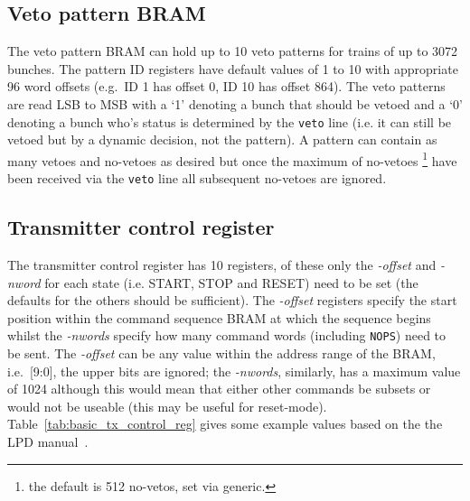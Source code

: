 \documentclass[]{article}
\begin{document}
    \subsection{Veto pattern BRAM} %
    \label{sub:basic_veto_pattern_bram}
    The veto pattern BRAM can hold up to 10 veto patterns for trains of up to 3072 bunches. The pattern ID registers have default values of 1 to 10 with appropriate 96 word offsets (e.g.\ ID 1 has offset 0, ID 10 has offset 864). The veto patterns are read LSB to MSB with a `1' denoting a bunch that should be vetoed and a `0' denoting a bunch who's status is determined by the \texttt{veto} line (i.e. it can still be vetoed but by a dynamic decision, not the pattern). A pattern can contain as many vetoes and no-vetoes as desired but once the maximum of no-vetoes \footnote{the default is 512 no-vetos, set via generic.} have been received via the \texttt{veto} line all subsequent no-vetoes are ignored.
    
    \subsection{Transmitter control register} %
    \label{sub:basic_transmitter_control_register}
    The transmitter control register has 10 registers, of these only the \emph{-offset} and \emph{-nword} for each state (i.e. START, STOP and RESET) need to be set (the defaults for the others should be sufficient). The \emph{-offset} registers specify the start position within the command sequence BRAM at which the sequence begins whilst the \emph{-nwords} specify how many command words (including \texttt{NOPS}) need to be sent. The \emph{-offset} can be any value within the address range of the BRAM, i.e.\ [9:0], the upper bits are ignored; the \emph{-nwords}, similarly, has a maximum value of 1024 although this would mean that either other commands be subsets or would not be useable (this may be useful for reset-mode). Table~\ref{tab:basic_tx_control_reg} gives some example values based on the the LPD manual~\cite{LPD MANUAL}.
    
\end{document}
